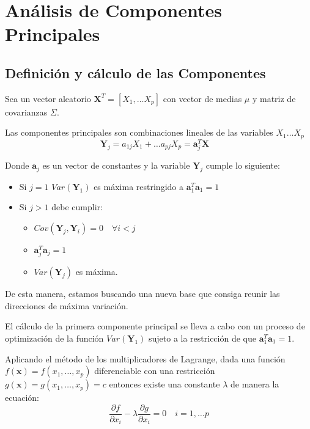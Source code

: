 \section{Análisis de Componentes Principales}
%

\subsection{Definición y cálculo de las Componentes}

\noindent Sea un vector aleatorio $\textbf{X}^T=[X_1,\ldots X_p]$ con vector de medias $\mu$ y matriz de covarianzas $\Sigma$.
\begin{defi}
Las componentes principales son combinaciones lineales de las variables $X_1 \ldots X_p$
\begin{equation}
\textbf{Y}_j=a_{1j}X_1+\ldots a_{pj}X_p=\textbf{a}_j^T\textbf{X}\quad 
\end{equation}

\noindent Donde $\textbf{a}_j$ es un vector de constantes y la variable $\textbf{Y}_j$ cumple lo siguiente:
\begin{itemize}
\item Si $j=1$ $Var(\textbf{Y}_1)$ es máxima restringido a $\textbf{a}_1^T \textbf{a}_1=1$
\item Si $j>1$ debe cumplir:
\begin{itemize}
\item $Cov(\textbf{Y}_j,\textbf{Y}_i)=0\quad \forall i<j $
\item $\textbf{a}_j^T \textbf{a}_j=1$
\item $Var(\textbf{Y}_j)$ es máxima. 
\end{itemize}

\end{itemize}

\noindent De esta manera, estamos buscando una nueva base que consiga reunir las direcciones de máxima variación. 
\end{defi}

\noindent El cálculo de la primera componente principal se lleva a cabo con un proceso de optimización de la función $Var(\textbf{Y}_1)$ sujeto a la restricción de que $\textbf{a}_1^T\textbf{a}_1=1$. 

\noindent Aplicando el método de los multiplicadores de Lagrange,  dada una función $f(\textbf{x})=f(x_1,\ldots, x_p)$ diferenciable con una restricción $g(\textbf{x})=g(x_1, \ldots, x_p)=c$ entonces existe una constante $\lambda$ de manera la ecuación:
\begin{equation}
\dfrac{\partial f}{\partial x_i}-\lambda\dfrac{\partial g}{\partial x_i}=0 \quad i=1,\ldots p 
\end{equation}

